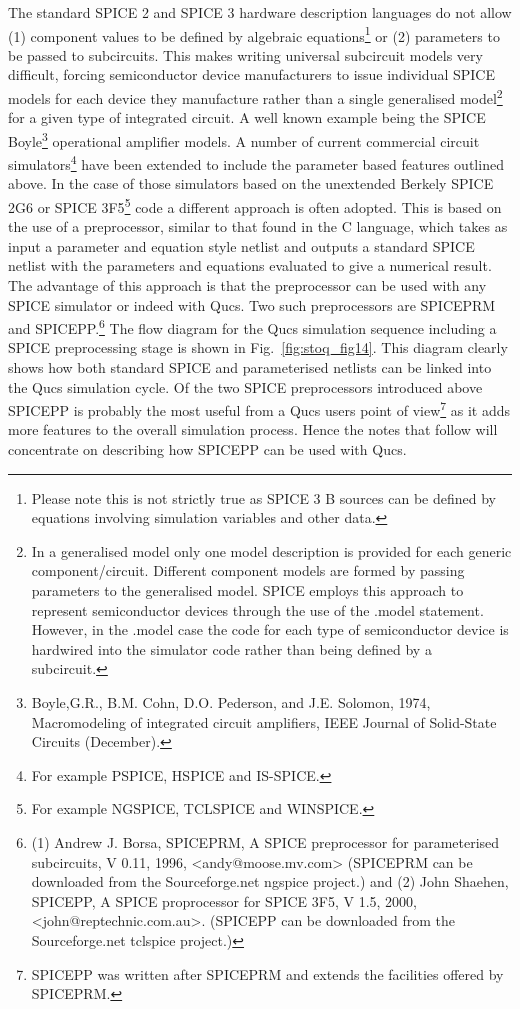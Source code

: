 The standard SPICE 2 and SPICE 3 hardware description languages do not allow (1) component values to be defined by algebraic equations\footnote{Please note this is not strictly true as SPICE 3 B sources can be defined by equations involving simulation variables and other data.} or (2) parameters to be passed to subcircuits. This makes writing universal subcircuit models very difficult, forcing semiconductor device manufacturers to issue individual SPICE models for each device they manufacture rather than a single generalised model\footnote{In a generalised model only one model description is provided for each generic component/circuit. Different component models are formed by passing parameters to the generalised model.  SPICE employs this approach to represent semiconductor devices through the use of the .model statement.  However, in the .model case the code for each type of semiconductor device is hardwired into the simulator code rather than being defined by a subcircuit.} for a given type of integrated circuit. A well known example being the SPICE Boyle\footnote{Boyle,G.R., B.M. Cohn, D.O. Pederson, and J.E. Solomon, 1974, Macromodeling of integrated circuit amplifiers, IEEE Journal of Solid-State Circuits (December).} operational amplifier models. A number of current commercial circuit simulators\footnote{For example PSPICE, HSPICE and IS-SPICE.} have been extended to include the parameter based features outlined above. In the case of those simulators based on the unextended Berkely SPICE 2G6 or SPICE 3F5\footnote{For example NGSPICE, TCLSPICE and WINSPICE.} code a different approach is often adopted. This is based on the use of a preprocessor, similar to that found in the C language, which takes as input a parameter and equation style netlist and outputs a standard SPICE netlist with the parameters and equations evaluated to give a numerical result.  The advantage of this approach is that the preprocessor can be used with any SPICE simulator or indeed with Qucs. Two such preprocessors are SPICEPRM and SPICEPP.\footnote{(1) Andrew J. Borsa, SPICEPRM, A SPICE preprocessor for parameterised subcircuits, V 0.11, 1996, <andy@moose.mv.com> (SPICEPRM can be downloaded from the Sourceforge.net ngspice project.) and (2) John Shaehen, SPICEPP, A SPICE proprocessor for SPICE 3F5, V 1.5, 2000, <john@reptechnic.com.au>. (SPICEPP can be downloaded from the Sourceforge.net tclspice project.)}  The flow diagram for the Qucs simulation sequence including a SPICE preprocessing stage is shown in Fig.~\ref{fig:stoq_fig14}. This diagram clearly shows how both standard SPICE and parameterised netlists can be linked into the Qucs simulation cycle. Of the two SPICE preprocessors introduced above SPICEPP is probably the most useful from a Qucs users point of view\footnote{SPICEPP was written after SPICEPRM and extends the facilities offered by SPICEPRM. } as it adds more features to the overall simulation process. Hence the notes that follow will concentrate on describing how SPICEPP can be used with Qucs.

